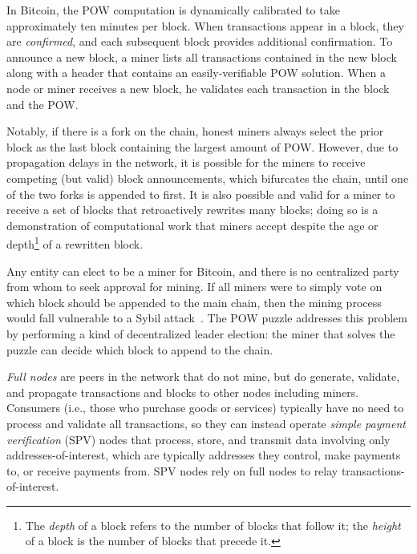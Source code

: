 In Bitcoin, the POW computation is dynamically calibrated to take
approximately ten minutes per block. When transactions appear in a
block, they are \emph{confirmed}, and each subsequent block
provides additional confirmation. To announce a new block, a miner
lists all transactions contained in the new block along with a header
that contains an easily-verifiable POW solution. When a node or
miner receives a new block, he validates each transaction in the block
and the POW.

Notably, if there is a fork on the chain, honest miners always select the prior block as the last block containing the largest amount of POW. However, due to propagation delays in the network, it is possible for the
miners to receive competing (but valid) block announcements, which
bifurcates the chain, until one of the two forks is appended to
first. It is also possible and valid for a miner to receive a set of
blocks that retroactively rewrites many blocks; doing so is a
demonstration of computational work that miners accept despite the age
or depth\footnote{The \emph{depth} of a block refers to the number of blocks that follow it; the \emph{height} of a block is the number of
blocks that precede it.} of a rewritten block.


Any entity can elect to be a miner for Bitcoin, and there is no
centralized party from whom to seek approval for mining. If all miners
were to simply vote on which block should be appended to the main chain, then the mining process would fall vulnerable to a Sybil
attack~\cite{Douceur:2002}. The POW puzzle addresses this
problem by performing a kind of decentralized leader election: the
miner that solves the puzzle can decide which block to append to the
chain.

 {\em Full nodes} are peers in the network that do not mine, but do
generate, validate, and propagate transactions and blocks to other
nodes including miners. Consumers (i.e., those who purchase goods or
services) typically have no need to process and validate all
transactions, so they can instead operate \emph{simple payment
  verification} (SPV) nodes that process, store, and transmit data
involving only addresses-of-interest, which are typically addresses
they control, make payments to, or receive payments from. SPV nodes
rely on full nodes to relay transactions-of-interest.

